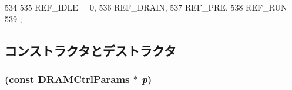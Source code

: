 \begin{DoxyCode}
534                       {
535         REF_IDLE = 0,
536         REF_DRAIN,
537         REF_PRE,
538         REF_RUN
539     };
\end{DoxyCode}


\subsection{コンストラクタとデストラクタ}
\hypertarget{classDRAMCtrl_af86a9f0ba5b3737e1a7ba1f97dbf0e91}{
\subsubsection[{DRAMCtrl}]{ (const DRAMCtrlParams $\ast$ {\em p})}}
\label{classDRAMCtrl_af86a9f0ba5b3737e1a7ba1f97dbf0e91}



